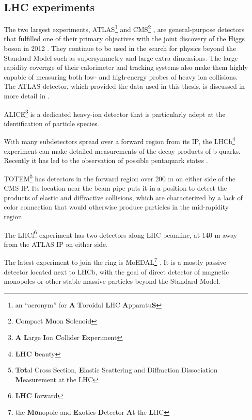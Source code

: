 \subsection{LHC experiments}
The two largest \lhc experiments, ATLAS\footnote{an ``acronym'' for \textbf{A} \textbf{T}oroidal \textbf{L}HC \textbf{A}pparatu\textbf{S}} \cite{Aad:2008zzm} and CMS\footnote{\textbf{C}ompact \textbf{M}uon \textbf{S}olenoid} \cite{Chatrchyan:2008aa}, are general-purpose detectors that fulfilled one of their primary objectives with the joint discovery of the Higgs boson in 2012 \cite{Aad:2012tfa,Chatrchyan:2012xdj}.
They continue to be used in the search for physics beyond the Standard Model such as supersymmetry and large extra dimensions.
The large rapidity coverage of their calorimeter and tracking systems also make them highly capable of measuring both low- and high-energy probes of heavy ion collisions.
The ATLAS detector, which provided the data used in this thesis, is discussed in more detail in .

ALICE\footnote{\textbf{A} \textbf{L}arge \textbf{I}on \textbf{C}ollider \textbf{E}xperiment} \cite{Aamodt:2008zz} is a dedicated heavy-ion detector that is particularly adept at the identification of particle species.

With many subdetectors spread over a forward region from its \ac{IP}, the LHCb\footnote{\textbf{LHC b}eauty} experiment \cite{Alves:2008zz} can make detailed measurements of the decay products of b-quarks. Recently it has led to the observation of possible pentaquark states \cite{Aaij:2015tga}.

TOTEM\footnote{\textbf{Tot}al Cross Section, \textbf{E}lastic Scattering and Diffraction Dissociation \textbf{M}easurement at the LHC} \cite{Anelli:2008zza} has detectors in the forward region over 200 m on either side of the CMS \ac{IP}.
Its location near the beam pipe puts it in a position to detect the products of elastic and diffractive collisions, which are characterized by a lack of color connection that would otherwise produce particles in the mid-rapidity region.

The LHCf\footnote{\textbf{LHC f}orward} experiment \cite{Adriani:2008zz} has two detectors along LHC beamline, at 140 m away from the ATLAS \ac{IP} on either side.

The latest experiment to join the ring is MoEDAL\footnote{the \textbf{Mo}nopole and \textbf{E}xotics \textbf{D}etector \textbf{A}t the \textbf{L}HC} \cite{Acharya:2014nyr}.
It is a mostly passive detector located next to LHCb, with the goal of direct detector of magnetic monopoles or other stable massive particles beyond the Standard Model.

